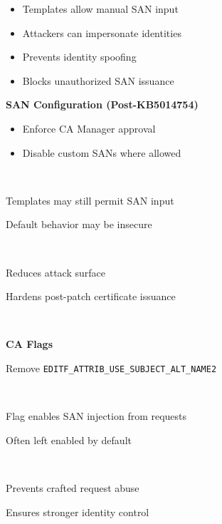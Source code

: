 \begin{itemize}
    \item Templates allow manual SAN input
    \item Attackers can impersonate identities
\end{itemize} 
\begin{itemize}
    \item Prevents identity spoofing
    \item Blocks unauthorized SAN issuance
\end{itemize} 


\textbf{SAN Configuration (Post-KB5014754)} \\
\parbox[t]{4.5cm}{\begin{itemize}[leftmargin=*,nosep]
    \item Enforce CA Manager approval
    \item Disable custom SANs where allowed
\end{itemize} \\
\begin{tightitemize}
    \item Templates may still permit SAN input
    \item Default behavior may be insecure
\end{tightitemize} \\
\begin{tightitemize}
    \item Reduces attack surface
    \item Hardens post-patch certificate issuance
\end{tightitemize} \\
\hline

\textbf{CA Flags} \\
\begin{tightitemize}
    \item Remove \texttt{EDITF\_ATTRIB\_USE\_SUBJECT\_ALT\_NAME2}
\end{tightitemize} \\
\begin{tightitemize}
    \item Flag enables SAN injection from requests
    \item Often left enabled by default
\end{tightitemize} \\
\begin{tightitemize}
    \item Prevents crafted request abuse
    \item Ensures stronger identity control
\end{tightitemize} \\
\hline

}
